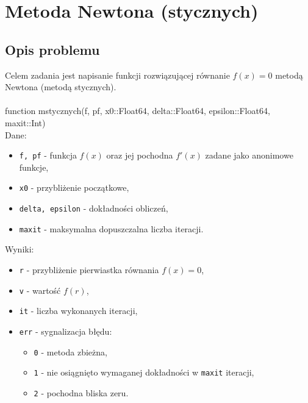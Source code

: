 \documentclass{article}
\begin{document}
\section{Metoda Newtona (stycznych)}
\subsection{Opis problemu}
Celem zadania jest napisanie funkcji rozwiązującej równanie $f(x) = 0$ metodą Newtona (metodą stycznych).\\
\\ function mstycznych(f, pf, x0::Float64, delta::Float64, epsilon::Float64, maxit::Int)
\\Dane:
\begin{itemize}
    \item \texttt{f, pf} - funkcja $f(x)$ oraz jej pochodna $f'(x)$ zadane jako anonimowe funkcje,
    \item \texttt{x0} - przybliżenie początkowe,
    \item \texttt{delta, epsilon} - dokładności obliczeń,
    \item \texttt{maxit} - maksymalna dopuszczalna liczba iteracji.
\end{itemize}
Wyniki:
\begin{itemize}
    \item \texttt{r} - przybliżenie pierwiastka równania $f(x) = 0$,
    \item \texttt{v} - wartość $f(r)$,
    \item \texttt{it} - liczba wykonanych iteracji,
    \item \texttt{err} - sygnalizacja błędu:
    \begin{itemize}[label={}]
        \item \texttt{0} - metoda zbieżna,
        \item \texttt{1} - nie osiągnięto wymaganej dokładności w \texttt{maxit} iteracji,
        \item \texttt{2} - pochodna bliska zeru.
\end{itemize}
\end{itemize}
\end{document}
